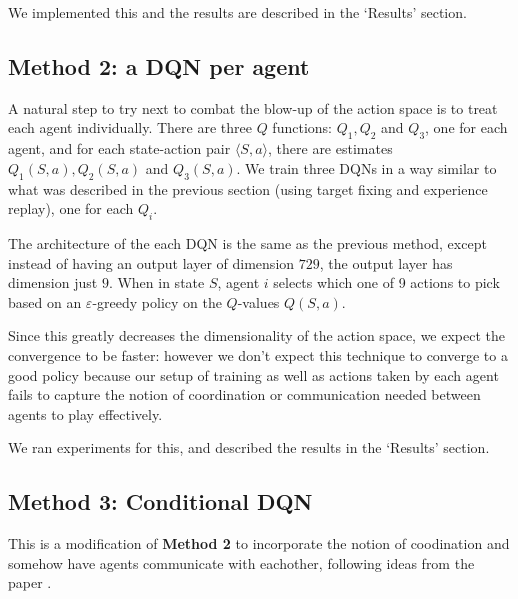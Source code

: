 \documentclass{article}
\begin{document}
We implemented this and the results are described in
the `Results' section.

\subsection{Method 2: a DQN per agent}
A natural step to try next to combat the blow-up
of the action space is to treat each agent
individually. There are three $Q$ functions:
$Q_1, Q_2$ and $Q_3$, one for each agent, and
for each state-action pair $\langle S,a\rangle$,
there are estimates $Q_1(S,a),Q_2(S,a)$ and
$Q_3(S,a)$. We train three DQNs in a way similar
to what was described in the previous section
(using target fixing and experience replay), one for
each $Q_i$.

The architecture of the each DQN is the same as the
previous method, except instead of having an output
layer of dimension $729$, the output layer has dimension
just $9$. When in state $S$, agent $i$ selects which one
of 9 actions to pick based on an $\varepsilon$-greedy policy
on the $Q$-values $Q(S,a)$.

Since this greatly decreases the dimensionality of
the action space, we expect the convergence to be
faster: however we don't expect this technique to
converge to a good policy because our setup
of training as well as actions taken by each agent
fails to capture the notion of coordination or
communication needed between agents to play effectively.

We ran experiments for this, and described the results in
the `Results' section.

\subsection{Method 3: Conditional DQN}
This is a modification of \textbf{Method 2} to incorporate
the notion of coodination and somehow have agents communicate
with eachother, following ideas from the paper \cite{foerster2016learning}.
\end{document}
